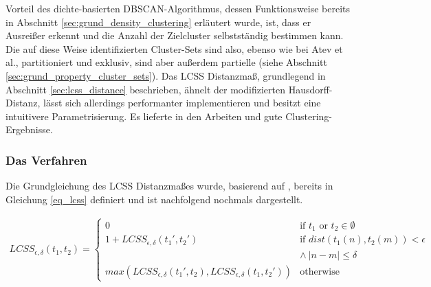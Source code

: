 Vorteil des dichte-basierten DBSCAN-Algorithmus, dessen Funktionsweise bereits in Abschnitt
\ref{sec:grund_density_clustering} erläutert wurde, ist, dass er Ausreißer erkennt und die Anzahl der
Zielcluster selbstständig bestimmen kann.
Die auf diese Weise identifizierten Cluster-Sets sind also, ebenso wie bei Atev et al., partitioniert und exklusiv,
sind aber außerdem partielle (siehe Abschnitt \ref{sec:grund_property_cluster_sets}).
Das LCSS Distanzmaß, grundlegend in Abschnitt \ref{sec:lcss_distance}
beschrieben, ähnelt der modifizierten Hausdorff-Distanz, lässt sich allerdings performanter implementieren
und besitzt eine intuitivere Parametrisierung. Es lieferte in den Arbeiten \cite[]{Morris2011} und
\cite[]{Chen2014} gute Clustering-Ergebnisse.

\subsubsection{Das Verfahren}

Die Grundgleichung des LCSS Distanzmaßes wurde, basierend auf \cite[]{Vlachos2002}, bereits in Gleichung
\ref{eq_lcss} definiert und ist nachfolgend nochmals dargestellt.

\begin{ceqn}
\begin{align*}
    LCSS_{\epsilon, \delta}(t_1, t_2) =
    \begin{cases}
        0 & \text{if } t_1 \text{ or } t_2 \in \emptyset \\
        1 + LCSS_{\epsilon, \delta}(t_1', t_2') & \text{if } dist(t_1(n), t_2(m)) < \epsilon \\
        & \land\ |n - m| \leq \delta \\
        max(LCSS_{\epsilon, \delta}(t_1', t_2), LCSS_{\epsilon, \delta}(t_1, t_2')) & \text{otherwise}
    \end{cases}
\end{align*}
\end{ceqn}

